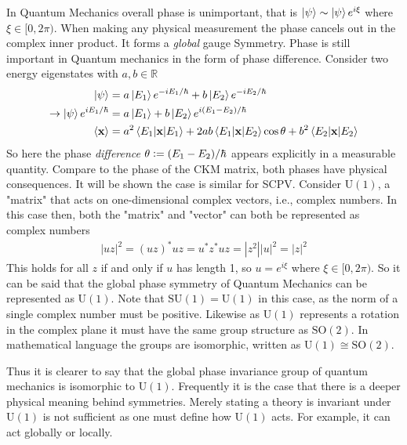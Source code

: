 In Quantum Mechanics overall phase is unimportant, that is $\ket{\psi} \sim \ket{\psi}e^{i\xi}$ where $\xi \in [0,2\pi)$. When making any physical measurement the phase cancels out in the complex inner product. It forms a \textit{global} gauge Symmetry. Phase is still important in Quantum mechanics in the form of phase difference. Consider two energy eigenstates with $a,b\in \mathbb{R}$
\begin{align*}
\ket{\psi} &= a\ket{E_1}e^{-iE_1/\hbar} +b \ket{E_2}e^{-iE_2/\hbar} \\
\rightarrow\ket{\psi}e^{iE_1/\hbar} &= a\ket{E_1} +b \ket{E_2}e^{i(E_1-E_2)/\hbar} \\
\braket{\mathbf{x}} &= a^2 \braket{E_1|\mathbf{x}|E_1} +2ab\braket{E_1 |\mathbf{x}|E_2}\cos \theta + b^2 \braket{E_2|\mathbf{x}|E_2}
\end{align*}
So here the phase \textit{difference} $\theta \vcentcolon= (E_1-E_2)/\hbar$ appears explicitly in a measurable quantity. Compare to the phase of the CKM matrix, both phases have physical consequences. It will be shown the case is similar for SCPV. Consider $\mathrm{U}(1)$, a "matrix" that acts on one-dimensional complex vectors, i.e., complex numbers. In this case then, both the "matrix" and "vector" can both be represented as complex numbers 
\begin{align*}
|uz|^2=(uz)^* uz = u^*z^* uz = |z^2||u|^2 = |z|^2
\end{align*}
This holds for all $z$ if and only if $u$ has length 1, so $u = e^{i\xi}$ where $\xi \in [0,2\pi)$. So it can be said that the global phase symmetry of Quantum Mechanics can be represented as $\mathrm{U}(1)$. Note that $\mathrm{SU}(1)=\mathrm{U}(1)$ in this case, as the norm of a single complex number must be positive. Likewise as $\mathrm{U}(1)$ represents a rotation in the complex plane it must have the same group structure as $\mathrm{SO}(2)$. In mathematical language the groups are isomorphic, written as $\mathrm{U}(1) \cong \mathrm{SO}(2)$.

Thus it is clearer to say that the global phase invariance group of quantum mechanics is isomorphic to $\mathrm{U}(1)$. Frequently it is the case that there is a deeper physical meaning behind symmetries. Merely stating a theory is invariant under $\mathrm{U}(1)$ is not sufficient as one must define how $\mathrm{U}(1)$ acts. For example, it can act globally or locally.

